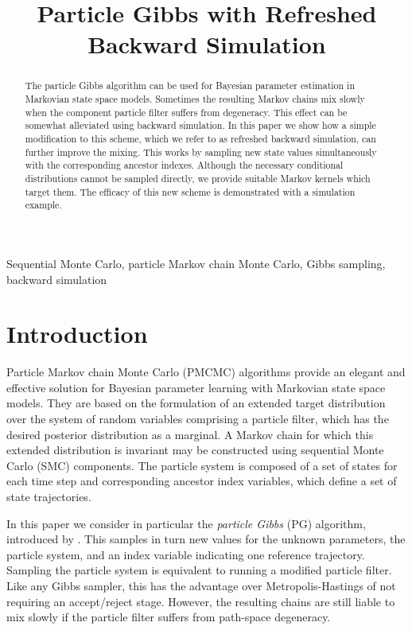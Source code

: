 \documentclass{article}
\title{Particle Gibbs with Refreshed Backward Simulation}
\begin{document}
\ninept
\maketitle

\begin{abstract}
 The particle Gibbs algorithm can be used for Bayesian parameter estimation in Markovian state space models. Sometimes the resulting Markov chains mix slowly when the component particle filter suffers from degeneracy. This effect can be somewhat alleviated using backward simulation. In this paper we show how a simple modification to this scheme, which we refer to as refreshed backward simulation, can further improve the mixing. This works by sampling new state values simultaneously with the corresponding ancestor indexes. Although the necessary conditional distributions cannot be sampled directly, we provide suitable Markov kernels which target them. The efficacy of this new scheme is demonstrated with a simulation example.
\end{abstract}
%
\begin{keywords}
Sequential Monte Carlo, particle Markov chain Monte Carlo, Gibbs sampling, backward simulation
\end{keywords}


\section{Introduction}
Particle Markov chain Monte Carlo (PMCMC) algorithms \cite{Andrieu2010,Olsson2011,Chopin2014,Lindsten2014} provide an elegant and effective solution for Bayesian parameter learning with Markovian state space models. They are based on the formulation of an extended target distribution over the system of random variables comprising a particle filter, which has the desired posterior distribution as a marginal. A Markov chain for which this extended distribution is invariant may be constructed using sequential Monte Carlo (SMC) components. The particle system is composed of a set of states for each time step and corresponding ancestor index variables, which define a set of state trajectories.

In this paper we consider in particular the \emph{particle Gibbs} (PG) algorithm, introduced by \cite{Andrieu2010}. This samples in turn new values for the unknown parameters, the particle system, and an index variable indicating one reference trajectory. Sampling the particle system is equivalent to running a modified particle filter. Like any Gibbs sampler, this has the advantage over Metropolis-Hastings of not requiring an accept/reject stage. However, the resulting chains are still liable to mix slowly if the particle filter suffers from path-space degeneracy.
\end{document}
